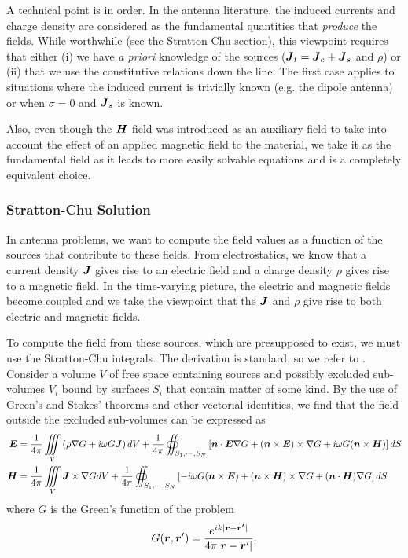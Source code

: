 A technical point is in order. In the antenna literature, the induced
currents and charge density are considered as the fundamental quantities 
that \textit{produce} the fields. While worthwhile (see the Stratton-Chu section), 
this viewpoint requires that either (i) we have \textit{a priori} knowledge of 
the sources ($\boldsymbol{J}_t=\boldsymbol{J}_c+\boldsymbol{J}_s$ and $\rho$) or (ii) that we use the
constitutive relations down the line. The first case applies to situations
where the induced current is trivially known (e.g. the dipole antenna) or
when $\sigma=0$ and $\boldsymbol{J}_s$ is known.

Also, even though the $\boldsymbol{H}$ field was introduced as an auxiliary field to take
into account the effect of an applied magnetic field to the material, we 
take it as the fundamental field as it leads to more easily solvable
equations and is a completely equivalent choice. 

\subsubsection{Stratton-Chu Solution}
In antenna problems, we want to compute the field values as a function of 
the sources that contribute to these fields. From electrostatics, we know 
that a current density $\boldsymbol{J}$ gives rise to an electric field and a charge 
density $\rho$ gives rise to a magnetic field. In the time-varying picture, 
the electric and magnetic fields become coupled and we take the viewpoint that
the $\boldsymbol{J}$ and $\rho$ give rise to both electric and magnetic fields. 

To compute the field from these sources, which are presupposed to exist, 
we must use the Stratton-Chu integrals. The derivation is standard, so we 
refer to \cite{ELL2003}. Consider a volume $V$ of free space containing
sources and possibly excluded sub-volumes $V_i$ bound by surfaces $S_i$ that contain matter
of some kind. By the use of Green's and Stokes' theorems and other vectorial 
identities, we find that the field outside the excluded sub-volumes
can be expressed as
  \begin{align}
   \boldsymbol{E} &= \frac{1}{4\pi}\mathop{\iiint}_V \left(\rho\nabla G+i\omega G\boldsymbol{J}\right)dV
	+\frac{1}{4\pi}\oiint_{S_1,\cdots,S_N}\left[\boldsymbol{n}\cdot\boldsymbol{E}\nabla G+(\boldsymbol{n}\times\boldsymbol{E})\times\nabla G+i\omega G(\boldsymbol{n}\times\boldsymbol{H})\right]dS\label{eq:antenna.strattonChuE}\\
   \boldsymbol{H} &= \frac{1}{4\pi}\mathop{\iiint}_V \boldsymbol{J}\times\nabla G dV
	+\frac{1}{4\pi}\oiint_{S_1,\cdots,S_N}\left[-i\omega G(\boldsymbol{n}\times\boldsymbol{E})+(\boldsymbol{n}\times\boldsymbol{H})\times\nabla G+(\boldsymbol{n}\cdot\boldsymbol{H})\nabla G\right]dS\label{eq:antenna.strattonChuH}
  \end{align}
where $G$ is the Green's function of the problem
  \begin{equation}
   G(\boldsymbol{r},\boldsymbol{r}') = \frac{e^{ik|\boldsymbol{r}-\boldsymbol{r'}|}}{4\pi|\boldsymbol{r}-\boldsymbol{r}'|}.
  \end{equation}

